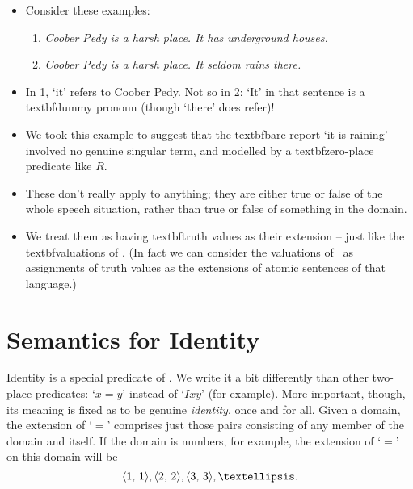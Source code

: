     \begin{itemize}
    \item Consider these examples:  \begin{enumerate}
    \item \emph{Coober Pedy is a harsh place. It has underground houses.}
    	\item \emph{Coober Pedy is a harsh place. It seldom rains there.}
    \end{enumerate}
    \item In 1, `it' refers to Coober Pedy. Not so in 2: `It' in that sentence is a textbf{dummy pronoun} (though `there' does refer)!

    \item We took this example to suggest that the textbf{bare} report `it is raining' involved no genuine singular term, and modelled by a textbf{zero-place predicate} like $R$. 
    	\item  These don't really apply to anything; they are either true or false of the whole speech situation, rather than true or false of something in the domain. 
    	\item We treat them as having textbf{truth values as their extension} – just like the textbf{valuations} of \TFL. (In fact we can consider the valuations of \TFL\ as assignments of truth values as the extensions of atomic sentences of that language.)
    \end{itemize}


\section{Semantics for Identity}
Identity is a special predicate of \FOL. We write it a bit differently than other two-place predicates: `$x=y$' instead of `$Ixy$' (for example). More important, though, its meaning is fixed as to be genuine \emph{identity}, once and for all. Given a domain, the extension of `$=$' comprises just those pairs consisting of any member of the domain and itself. If the domain is numbers, for example, the extension of `$=$' on this domain will be $$\ntuple{1, 1}, \ntuple{2, 2}, \ntuple{3, 3},….$$ 

